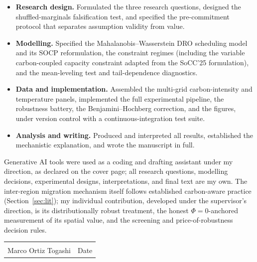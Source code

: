 \documentclass[12pt]{article}
\begin{document}
\begin{itemize}[leftmargin=1.4em,itemsep=2pt]
\item \textbf{Research design.} Formulated the three research questions, designed
the shuffled-marginals falsification test, and specified the pre-commitment
protocol that separates assumption validity from value.
\item \textbf{Modelling.} Specified the Mahalanobis--Wasserstein DRO scheduling
model and its SOCP reformulation, the constraint regimes (including the variable
carbon-coupled capacity constraint adapted from the SoCC'25 formulation), and the
mean-leveling test and tail-dependence diagnostics.
\item \textbf{Data and implementation.} Assembled the multi-grid carbon-intensity
and temperature panels, implemented the full experimental pipeline, the robustness
battery, the Benjamini--Hochberg correction, and the figures, under
version control with a continuous-integration test suite.
\item \textbf{Analysis and writing.} Produced and interpreted all results,
established the mechanistic explanation, and wrote the manuscript in full.
\end{itemize}

Generative AI tools were used as a coding and drafting assistant under my
direction, as declared on the cover page; all research questions, modelling
decisions, experimental designs, interpretations, and final text are my own. The
inter-region migration mechanism itself follows established carbon-aware practice
(Section~\ref{sec:lit}); my individual contribution, developed under the supervisor's
direction, is its distributionally robust treatment, the honest $\Phi=0$-anchored
measurement of its spatial value, and the screening and price-of-robustness decision
rules.

\vspace{1.2cm}
\noindent\begin{tabular}{@{}p{6cm}p{6cm}@{}}
\hrulefill & \hrulefill\\
Marco Ortiz Togashi & Date\\
\end{tabular}
\end{document}
